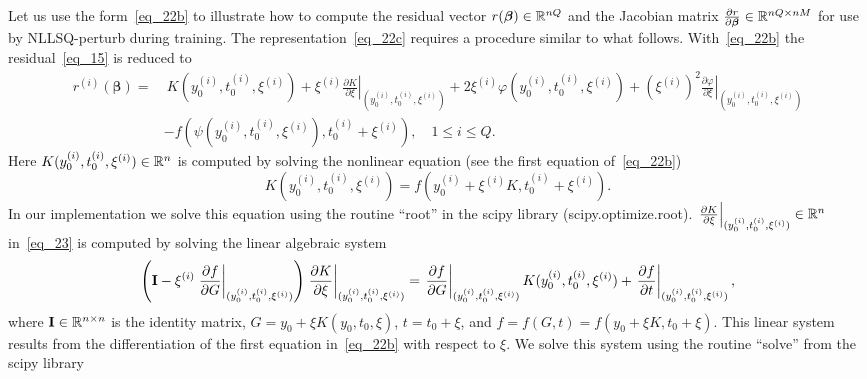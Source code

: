 \begin{remark}
  Let us use the form~\eqref{eq_22b}
  to illustrate how to compute the residual
  vector $r(\bm\beta)\in\mathbb{R}^{nQ}$ and the Jacobian matrix
  $\frac{\partial r}{\partial\bm\beta}\in\mathbb{R}^{nQ\times nM}$
  for use by NLLSQ-perturb during training.
  The representation~\eqref{eq_22c} requires a procedure similar
  to what follows.
  With~\eqref{eq_22b}
  the residual~\eqref{eq_15} is reduced to
  \begin{equation}\label{eq_23}
    \begin{split}
    r^{(i)}(\bm\beta) =& \ K(y_0^{(i)},t_0^{(i)},\xi^{(i)})
    + \xi^{(i)}\left.\frac{\partial K}{\partial\xi} \right|_{(y_0^{(i)},t_0^{(i)},\xi^{(i)})}
    + 2\xi^{(i)}\varphi(y_0^{(i)},t_0^{(i)},\xi^{(i)})
    + (\xi^{(i)})^2\left.\frac{\partial\varphi}{\partial\xi} \right|_{(y_0^{(i)},t_0^{(i)},\xi^{(i)})}\\
    &- f(\psi(y_0^{(i)},t_0^{(i)},\xi^{(i)}),t_0^{(i)}+\xi^{(i)}),
    \quad 1\leqslant i\leqslant Q.
    \end{split}
  \end{equation}
  Here $K(y_0^{(i)},t_0^{(i)},\xi^{(i)})\in\mathbb{R}^n$ is computed by solving
  the nonlinear equation (see the first equation of~\eqref{eq_22b})
  \begin{equation}\label{eq_24}
    K(y_0^{(i)},t_0^{(i)},\xi^{(i)}) = f(y_0^{(i)} + \xi^{(i)}K,t_0^{(i)}+\xi^{(i)}).
  \end{equation}
  In our implementation we solve this equation using the
  routine ``root'' in the scipy library (scipy.optimize.root).
  $\left.\frac{\partial K}{\partial\xi} \right|_{(y_0^{(i)},t_0^{(i)},\xi^{(i)})}\in\mathbb{R}^n$
  in~\eqref{eq_23} is computed by solving the linear algebraic system
  \begin{equation}\label{eq_25}
    \left(\mathbf{I} - \xi^{(i)}\left.\frac{\partial f}{\partial G} \right|_{(y_0^{(i)},t_0^{(i)},\xi^{(i)})} \right)
    \left.\frac{\partial K}{\partial\xi} \right|_{(y_0^{(i)},t_0^{(i)},\xi^{(i)})}
    = \left.\frac{\partial f}{\partial G} \right|_{(y_0^{(i)},t_0^{(i)},\xi^{(i)})}
    K(y_0^{(i)},t_0^{(i)},\xi^{(i)})
    + \left.\frac{\partial f}{\partial t}\right|_{(y_0^{(i)},t_0^{(i)},\xi^{(i)})}, 
  \end{equation}
  where $\mathbf{I}\in \mathbb{R}^{n\times n}$ is the identity matrix,
  $G = y_0 + \xi K(y_0,t_0,\xi)$, $t = t_0+\xi$, and
  $f = f(G,t)=f(y_0+\xi K, t_0+\xi)$.
  This linear system results from the differentiation of the
  first equation in~\eqref{eq_22b} with respect to $\xi$. We solve this system
  using the routine ``solve'' from the scipy library

\end{remark}
